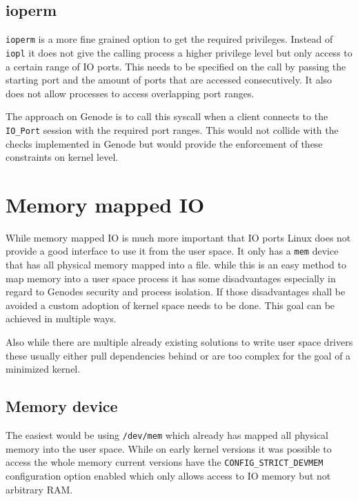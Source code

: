 \documentclass[
a4paper,
12pt,
notitlepage,
parskip=half,
DIV=11,
]{scrbook}
\begin{document}
		\subsection{ioperm}
		
		\texttt{ioperm} is a more fine grained option to get the required privileges.
		Instead of \texttt{iopl} it does not give the calling process a higher privilege level but only access to a certain range of IO ports.
		This needs to be specified on the call by passing the starting port and the amount of ports that are accessed consecutively.
		It also does not allow processes to access overlapping port ranges. \citep{ioperm}
		
		The approach on Genode is to call this syscall when a client connects to the \texttt{IO\_Port} session with the required port ranges.
		This would not collide with the checks implemented in Genode but would provide the enforcement of these constraints on kernel level.
		
		\section{Memory mapped IO}
		
		While memory mapped IO is much more important that IO ports Linux does not provide a good interface to use it from the user space.
		It only has a \texttt{mem} device that has all physical memory mapped into a file.
		while this is an easy method to map memory into a user space process it has some disadvantages especially in regard to Genodes security and process isolation.
		If those disadvantages shall be avoided a custom adoption of kernel space needs to be done.
		This goal can be achieved in multiple ways.
		
		Also while there are multiple already existing solutions to write user space drivers these usually either pull dependencies behind or are too complex for the goal of a minimized kernel.
		
		\subsection{Memory device}
		
		The easiest would be using \texttt{/dev/mem} which already has mapped all physical memory into the user space.
		While on early kernel versions it was possible to access the whole memory current versions have the \texttt{CONFIG\_STRICT\_DEVMEM} configuration option enabled which only allows access to IO memory but not arbitrary RAM.
		
\end{document}
